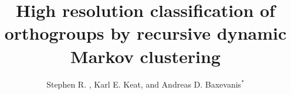 \documentclass[nogrid]{MBE}%
\begin{document}
\title[RD-MCL]{High resolution classification of orthogroups by recursive dynamic Markov clustering}


\author[Bond et al.]{Stephen R. , Karl E.
Keat, and Andreas D. Baxevanis$^{\ast}$}

\address{Computational and Statistical Genomics Branch, Division of Intramural Research, National Human Genome Research Institute, National Institutes of Health, 50 South Drive, Bethesda, MD, USA, 20892}





\editor{}

\abstract{}



\maketitle
\end{document}
